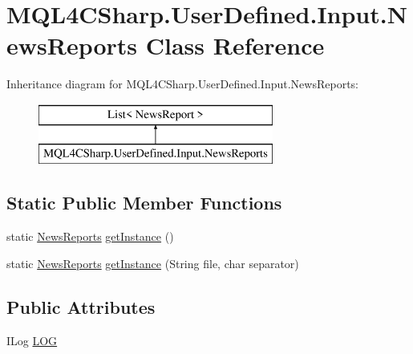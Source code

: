 \hypertarget{class_m_q_l4_c_sharp_1_1_user_defined_1_1_input_1_1_news_reports}{}\section{M\+Q\+L4\+C\+Sharp.\+User\+Defined.\+Input.\+News\+Reports Class Reference}
\label{class_m_q_l4_c_sharp_1_1_user_defined_1_1_input_1_1_news_reports}
Inheritance diagram for M\+Q\+L4\+C\+Sharp.\+User\+Defined.\+Input.\+News\+Reports\+:\begin{figure}[H]
\begin{center}
\leavevmode
\includegraphics[height=2.000000cm]{class_m_q_l4_c_sharp_1_1_user_defined_1_1_input_1_1_news_reports}
\end{center}
\end{figure}
\subsection*{Static Public Member Functions}
\begin{DoxyCompactItemize}
\item 
static \hyperlink{class_m_q_l4_c_sharp_1_1_user_defined_1_1_input_1_1_news_reports}{News\+Reports} \hyperlink{class_m_q_l4_c_sharp_1_1_user_defined_1_1_input_1_1_news_reports_af454677580bf345c831cd53d9e9afb1d}{get\+Instance} ()
\item 
static \hyperlink{class_m_q_l4_c_sharp_1_1_user_defined_1_1_input_1_1_news_reports}{News\+Reports} \hyperlink{class_m_q_l4_c_sharp_1_1_user_defined_1_1_input_1_1_news_reports_a96d06c201d70a8a4e785f9407865ca53}{get\+Instance} (String file, char separator)
\end{DoxyCompactItemize}
\subsection*{Public Attributes}
\begin{DoxyCompactItemize}
\item 
I\+Log \hyperlink{class_m_q_l4_c_sharp_1_1_user_defined_1_1_input_1_1_news_reports_a79e68718c9b5e0cbc9248b150d3598ed}{L\+OG}
\end{DoxyCompactItemize}


